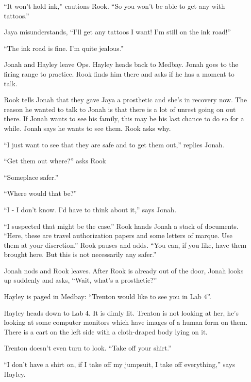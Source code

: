 ``It won't hold ink,'' cautions Rook.  ``So you won't be able to get any with tattoos.''

Jaya misunderstands, ``I'll get any tattoos I want!  I'm still on the ink road!''

``The ink road is fine.  I'm quite jealous.''



Jonah and Hayley leave Ops.  Hayley heads back to Medbay.   Jonah goes to the firing range to practice.  Rook finds him there and asks if he has a moment to talk.

Rook tells Jonah that they gave Jaya a prosthetic and she's in recovery now.  The reason he wanted to talk to Jonah is that there is a lot of unrest going on out there.  If Jonah wants to see his family, this may be his last chance to do so for a while.  Jonah says he wants to see them.  Rook asks why.

``I just want to see that they are safe and to get them out,'' replies Jonah.

``Get them out where?'' asks Rook

``Someplace safer.''

``Where would that be?''

``I - I don't know.  I'd have to think about it,'' says Jonah.

``I suspected that might be the case.''  Rook hands Jonah a stack of documents.  ``Here, these are travel authorization papers and some letters of marque.  Use them at your discretion.''  Rook pauses and adds.  ``You can, if you like, have them brought here.  But this is not necessarily any safer.''

Jonah nods and Rook leaves.  After Rook is already out of the door, Jonah looks up suddenly and asks, ``Wait, what's a prosthetic?''



Hayley is paged in Medbay: ``Trenton would like to see you in Lab 4''.



Hayley heads down to Lab 4.  It is dimly lit.  Trenton is not looking at her, he's looking at some computer monitors which have images of a human form on them.  There is a cart on the left side with a cloth-draped body lying on it.  



Trenton doesn't even turn to look.  ``Take off your shirt.''

``I don't have a shirt on, if I take off my jumpsuit, I take off everything,'' says Hayley.

